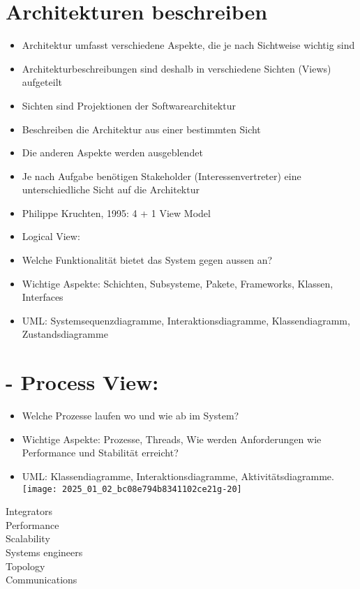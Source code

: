 \documentclass[10pt]{article}
\begin{document}
\section*{Architekturen beschreiben}
\begin{itemize}
  \item Architektur umfasst verschiedene Aspekte, die je nach Sichtweise wichtig sind
  \item Architekturbeschreibungen sind deshalb in verschiedene Sichten (Views) aufgeteilt
  \item Sichten sind Projektionen der Softwarearchitektur
  \item Beschreiben die Architektur aus einer bestimmten Sicht
  \item Die anderen Aspekte werden ausgeblendet
  \item Je nach Aufgabe benötigen Stakeholder (Interessenvertreter) eine unterschiedliche Sicht auf die Architektur
  \item Philippe Kruchten, 1995: 4 + 1 View Model
  \item Logical View:
  \item Welche Funktionalität bietet das System gegen aussen an?
  \item Wichtige Aspekte: Schichten, Subsysteme, Pakete, Frameworks, Klassen, Interfaces
  \item UML: Systemsequenzdiagramme, Interaktionsdiagramme, Klassendiagramm, Zustandsdiagramme
\end{itemize}

\section*{- Process View:}
\begin{itemize}
  \item Welche Prozesse laufen wo und wie ab im System?
  \item Wichtige Aspekte: Prozesse, Threads, Wie werden Anforderungen wie Performance und Stabilität erreicht?
  \item UML: Klassendiagramme, Interaktionsdiagramme, Aktivitätsdiagramme.\\
\texttt{[image: 2025\_01\_02\_bc08e794b8341102ce21g-20]}
\end{itemize}

Integrators\\
Performance\\
Scalability\\
Systems engineers\\
Topology\\
Communications
\end{document}

